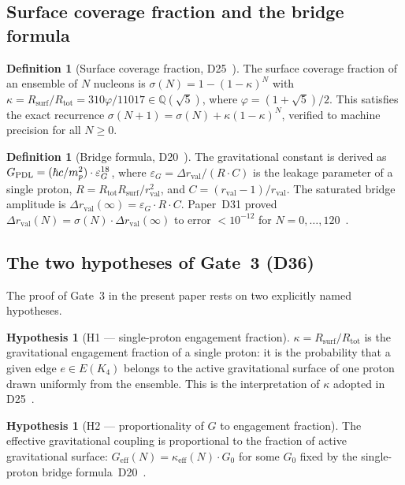 \documentclass[11pt,a4paper]{article}
\theoremstyle{definition}
\newtheorem{definition}[theorem]{Definition}
\newtheorem{hypothesis}[theorem]{Hypothesis}
\newcommand{\PDL}{\textnormal{PDL}}
\newcommand{\Rsurf}{R_{\mathrm{surf}}}
\newcommand{\Rtot}{R_{\mathrm{tot}}}
\newcommand{\rval}{r_{\mathrm{val}}}
\newcommand{\hb}{\hbar}
\newcommand{\vp}{\varphi}
\newcommand{\GPDL}{G_{\PDL}}
\newcommand{\Geff}{G_{\mathrm{eff}}}
\newcommand{\sig}{\sigma}
\newcommand{\kap}{\kappa}
\newcommand{\Kfour}{K_4}
\newcommand{\epsg}{\varepsilon_G}
\begin{document}
\subsection{Surface coverage fraction and the bridge formula}

\begin{definition}[Surface coverage fraction, D25~\cite{Effective_Sigma_PDL_2026}]
\label{def:sigma}
The surface coverage fraction of an ensemble of $N$ nucleons is $\sig(N) = 1-(1-\kap)^N$ with $\kap = \Rsurf/\Rtot = 310\vp/11017 \in \mathbb{Q}(\sqrt{5})$, where $\vp = (1+\sqrt{5})/2$. This satisfies the exact recurrence $\sig(N+1) = \sig(N) + \kap(1-\kap)^N$, verified to machine precision for all $N\geq 0$.
\end{definition}

\begin{definition}[Bridge formula, D20~\cite{Bridge_PDL_2026}]
\label{def:bridge}
The gravitational constant is derived as $\GPDL = (\hb c/m_p^2)\cdot\epsg^{18}$, where $\epsg = \Delta r_{\mathrm{val}}/(R\cdot C)$ is the leakage parameter of a single proton, $R = \Rtot\Rsurf/\rval^2$, and $C = (\rval-1)/\rval$. The saturated bridge amplitude is $\Delta r_{\mathrm{val}}(\infty) = \epsg\cdot R\cdot C$. Paper~D31 proved $\Delta r_{\mathrm{val}}(N) = \sig(N)\cdot\Delta r_{\mathrm{val}}(\infty)$ to error $<10^{-12}$ for $N=0,\ldots,120$~\cite{PDL_D31_2026}.
\end{definition}

\subsection{The two hypotheses of Gate~3 (D36)}

The proof of Gate~3 in the present paper rests on two explicitly named hypotheses.

\begin{hypothesis}[H1 — single-proton engagement fraction]
\label{hyp:H1}
$\kap = \Rsurf/\Rtot$ is the gravitational engagement fraction of a single proton: it is the probability that a given edge $e \in E(\Kfour)$ belongs to the active gravitational surface of one proton drawn uniformly from the ensemble. This is the interpretation of $\kap$ adopted in D25~\cite{Effective_Sigma_PDL_2026}.
\end{hypothesis}

\begin{hypothesis}[H2 — proportionality of $G$ to engagement fraction]
\label{hyp:H2}
The effective gravitational coupling is proportional to the fraction of active gravitational surface: $\Geff(N) = \kap_{\mathrm{eff}}(N)\cdot G_0$ for some $G_0$ fixed by the single-proton bridge formula~D20~\cite{Bridge_PDL_2026}.
\end{hypothesis}
\end{document}
